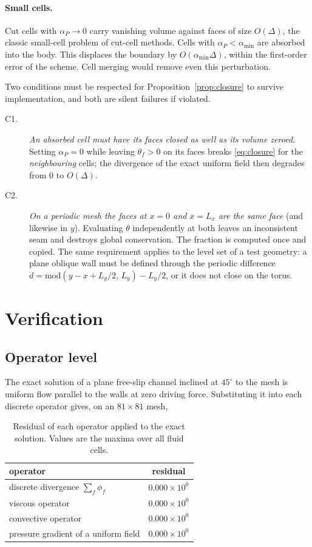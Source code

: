 \documentclass[11pt,a4paper]{article}
\theoremstyle{remark}
\begin{document}
\paragraph{Small cells.} Cut cells with $\alpha_P\to0$ carry vanishing volume against faces of
size $O(\Delta)$, the classic small-cell problem of cut-cell methods. Cells with
$\alpha_P<\alpha_{\min}$ are absorbed into the body. This displaces the boundary by
$O(\alpha_{\min}\Delta)$, within the first-order error of the scheme. Cell merging would
remove even this perturbation.

Two conditions must be respected for Proposition~\ref{prop:closure} to survive
implementation, and both are silent failures if violated.

\begin{description}
\item[C1.] \emph{An absorbed cell must have its faces closed as well as its volume zeroed.}
Setting $\alpha_P=0$ while leaving $\theta_f>0$ on its faces breaks \eqref{eq:closure} for the
\emph{neighbouring} cells; the divergence of the exact uniform field then degrades from $0$ to
$O(\Delta)$.
\item[C2.] \emph{On a periodic mesh the faces at $x=0$ and $x=L_x$ are the same face} (and
likewise in $y$). Evaluating $\theta$ independently at both leaves an inconsistent seam and
destroys global conservation. The fraction is computed once and copied. The same requirement
applies to the level set of a test geometry: a plane oblique wall must be defined through the
periodic difference $d=\mathrm{mod}(y-x+L_y/2,\,L_y)-L_y/2$, or it does not close on the
torus.
\end{description}

\section{Verification}

\subsection{Operator level}
The exact solution of a plane free-slip channel inclined at $45^\circ$ to the mesh is uniform
flow parallel to the walls at zero driving force. Substituting it into each discrete operator
gives, on an $81\times81$ mesh,

\begin{table}[h]\centering
\caption{Residual of each operator applied to the exact solution. Values are the maxima over
all fluid cells.}
\label{tab:oplevel}
\begin{tabular}{lc}
\toprule
operator & residual\\
\midrule
discrete divergence $\sum_f\phi_f$      & $0.000\times10^{0}$\\
viscous operator                        & $0.000\times10^{0}$\\
convective operator                     & $0.000\times10^{0}$\\
pressure gradient of a uniform field    & $0.000\times10^{0}$\\
\bottomrule
\end{tabular}
\end{table}
\end{document}
